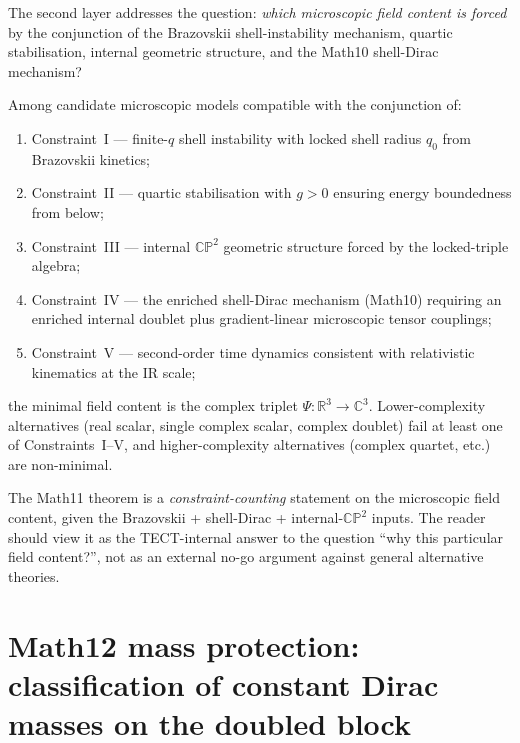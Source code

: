 The second layer addresses the question: \emph{which microscopic
field content is forced} by the conjunction of the Brazovskii
shell-instability mechanism, quartic stabilisation, internal
geometric structure, and the Math10 shell-Dirac mechanism?

\begin{theorem}
\label{thm:Math11-minimal-model}
Among candidate microscopic models compatible with the conjunction
of:
\begin{enumerate}
\item Constraint~I --- finite-$q$ shell instability with locked
shell radius $q_0$ from Brazovskii kinetics;
\item Constraint~II --- quartic stabilisation with $g > 0$ ensuring
energy boundedness from below;
\item Constraint~III --- internal $\mathbb{CP}^2$ geometric
structure forced by the locked-triple algebra;
\item Constraint~IV --- the enriched shell-Dirac mechanism
(Math10) requiring an enriched internal doublet plus
gradient-linear microscopic tensor couplings;
\item Constraint~V --- second-order time dynamics consistent with
relativistic kinematics at the IR scale;
\end{enumerate}
the minimal field content is the complex triplet
$\Psi : \mathbb{R}^3 \to \mathbb{C}^3$. Lower-complexity
alternatives (real scalar, single complex scalar, complex doublet)
fail at least one of Constraints~I--V, and higher-complexity
alternatives (complex quartet, etc.) are non-minimal.
\end{theorem}

\begin{remark}
The Math11 theorem is a \emph{constraint-counting} statement on the
microscopic field content, given the Brazovskii + shell-Dirac +
internal-$\mathbb{CP}^2$ inputs. The reader should view it as the
TECT-internal answer to the question ``why this particular
field content?'', not as an external no-go argument against general
alternative theories.
\end{remark}

\section{Math12 mass protection: classification of constant Dirac
masses on the doubled block}\label{sec:Math12}

